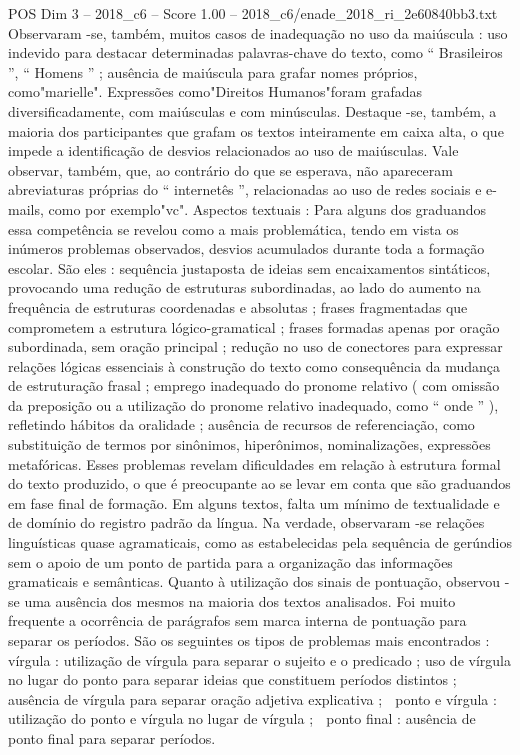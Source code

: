 \begin{textsample}{POS Dim 3 – 2018\_c6 – Score 1.00 – 2018\_c6/enade\_2018\_ri\_2e60840bb3.txt}
Observaram -se, também, muitos casos de inadequação no uso da maiúscula : uso indevido para destacar determinadas palavras-chave do texto, como “ Brasileiros ”, “ Homens ” ; ausência de maiúscula para grafar nomes próprios, como"marielle".
Expressões como"Direitos Humanos"foram grafadas diversificadamente, com maiúsculas e com minúsculas.
Destaque -se, também, a maioria dos participantes que grafam os textos inteiramente em caixa alta, o que impede a identificação de desvios relacionados ao uso de maiúsculas.
Vale observar, também, que, ao contrário do que se esperava, não apareceram abreviaturas próprias do “ internetês ”, relacionadas ao uso de redes sociais e e-mails, como por exemplo"vc".
Aspectos textuais : Para alguns dos graduandos essa competência se revelou como a mais problemática, tendo em vista os inúmeros problemas observados, desvios acumulados durante toda a formação escolar.
São eles : sequência justaposta de ideias sem encaixamentos sintáticos, provocando uma redução de estruturas subordinadas, ao lado do aumento na frequência de estruturas coordenadas e absolutas ; frases fragmentadas que comprometem a estrutura lógico-gramatical ; frases formadas apenas por oração subordinada, sem oração principal ; redução no uso de conectores para expressar relações lógicas essenciais à construção do texto como consequência da mudança de estruturação frasal ; emprego inadequado do pronome relativo ( com omissão da preposição ou a utilização do pronome relativo inadequado, como “ onde ” ), refletindo hábitos da oralidade ; ausência de recursos de referenciação, como substituição de termos por sinônimos, hiperônimos, nominalizações, expressões metafóricas.
Esses problemas revelam dificuldades em relação à estrutura formal do texto produzido, o que é preocupante ao se levar em conta que são graduandos em fase final de formação.
Em alguns textos, falta um mínimo de textualidade e de domínio do registro padrão da língua.
Na verdade, observaram -se relações linguísticas quase agramaticais, como as estabelecidas pela sequência de gerúndios sem o apoio de um ponto de partida para a organização das informações gramaticais e semânticas.
Quanto à utilização dos sinais de pontuação, observou -se uma ausência dos mesmos na maioria dos textos analisados.
Foi muito frequente a ocorrência de parágrafos sem marca interna de pontuação para separar os períodos.
São os seguintes os tipos de problemas mais encontrados :  vírgula : utilização de vírgula para separar o sujeito e o predicado ; uso de vírgula no lugar do ponto para separar ideias que constituem períodos distintos ; ausência de vírgula para separar oração adjetiva explicativa ;  ponto e vírgula : utilização do ponto e vírgula no lugar de vírgula ;  ponto final : ausência de ponto final para separar períodos.

\end{textsample}
